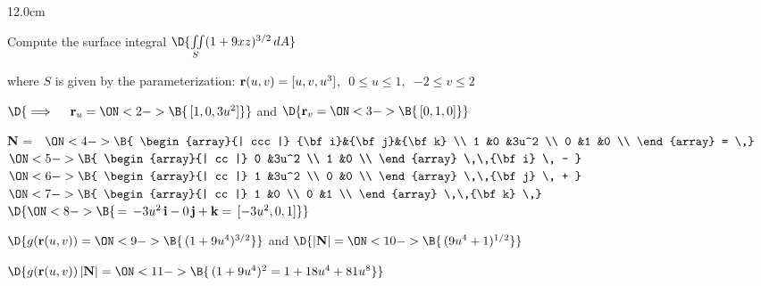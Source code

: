 \begin{frame}
\begin{columns}\begin{column}{12.0cm}
\scriptsize

\EX Compute the surface integral \qquad $\D{\iint \limits_{S} (1 + 9xz)^{3/2}\, dA}$

\vspace{0.1cm}

where $S$ is given by the parameterization: ${\bf r}(u,v) = [u,v,u^3]$,\,\, $0 \le u \le 1$,\,\, $-2 \le v \le 2$

\vspace{0.2cm}

$\D{
\implies \quad {\bf r}_u =
\ON<2->{\B{\, [1,0,3u^2]}}}$ \qquad 
and
\qquad $\D{
{\bf r}_v = 
\ON<3->{\B{\,[0,1,0]}}}$

\vspace{0.3cm}

{\bf N} = \,
$\ON<4->{\B{
\begin{array}{| ccc |}
	{\bf i}&{\bf j}&{\bf k} \\
	1 &0 &3u^2 \\
 	0 &1 &0 \\
\end{array}
= \,}}$
$\ON<5->{\B{
\begin{array}{| cc |}
	0 &3u^2 \\
 	1 &0 \\
\end{array}
 \,\,{\bf i} \, - }}$\,\,
$\ON<6->{\B{
\begin{array}{| cc |}
	1 &3u^2 \\
 	0 &0 \\
\end{array}
 \,\,{\bf j} \, + }}$\,\,
$\ON<7->{\B{
\begin{array}{| cc |}
	1 &0 \\
 	0 &1 \\
\end{array}
\,\,{\bf k} \,}}$
$\D{
\ON<8->{\B{\, = \, -3u^2 \,{\bf i} - 0\,{\bf j} + {\bf k} = \, [-3u^2,0,1]}}}$

\vspace{0.4cm}

$\D{g({\bf r}(u,v)) = 
\ON<9->{\B{\,(1+9u^4)^{3/2}}}}$
\quad and \quad 
$\D{|{\bf N}| = 
\ON<10->{\B{\,(9u^4+1)^{1/2}}}}$

\vspace{0.3cm}

$\D{g({\bf r}(u,v))\, |{\bf N}| = 
\ON<11->{\B{\,(1+9u^4)^2 = 1 + 18u^4 + 81u^8}}}$


\end{column}
\end{columns}
\end{frame}

